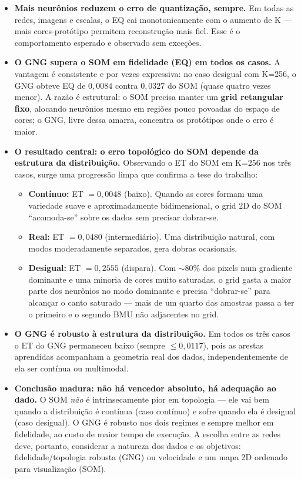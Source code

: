 \documentclass[11pt,a4paper]{article}
\begin{document}
\begin{itemize}
    \item \textbf{Mais neurônios reduzem o erro de quantização, sempre.} Em todas as redes, imagens e escalas, o EQ cai monotonicamente com o aumento de K --- mais cores-protótipo permitem reconstrução mais fiel. Esse é o comportamento esperado e observado sem exceções.

    \item \textbf{O GNG supera o SOM em fidelidade (EQ) em todos os casos.} A vantagem é consistente e por vezes expressiva: no caso desigual com K=256, o GNG obteve EQ de $0{,}0084$ contra $0{,}0327$ do SOM (quase quatro vezes menor). A razão é estrutural: o SOM precisa manter um \textbf{grid retangular fixo}, alocando neurônios mesmo em regiões pouco povoadas do espaço de cores; o GNG, livre dessa amarra, concentra os protótipos onde o erro é maior.

    \item \textbf{O resultado central: o erro topológico do SOM depende da estrutura da distribuição.} Observando o ET do SOM em K=256 nos três casos, surge uma progressão limpa que confirma a tese do trabalho:
    \begin{itemize}
        \item \textbf{Contínuo:} ET $= 0{,}0048$ (baixo). Quando as cores formam uma variedade suave e aproximadamente bidimensional, o grid 2D do SOM ``acomoda-se'' sobre os dados sem precisar dobrar-se.
        \item \textbf{Real:} ET $= 0{,}0480$ (intermediário). Uma distribuição natural, com modos moderadamente separados, gera dobras ocasionais.
        \item \textbf{Desigual:} ET $= 0{,}2555$ (dispara). Com $\sim$80\% dos pixels num gradiente dominante e uma minoria de cores muito saturadas, o grid gasta a maior parte dos neurônios no modo dominante e precisa ``dobrar-se'' para alcançar o canto saturado --- mais de um quarto das amostras passa a ter o primeiro e o segundo BMU não adjacentes no grid.
    \end{itemize}

    \item \textbf{O GNG é robusto à estrutura da distribuição.} Em todos os três casos o ET do GNG permaneceu baixo (sempre $\le 0{,}0117$), pois as arestas aprendidas acompanham a geometria real dos dados, independentemente de ela ser contínua ou multimodal.

    \item \textbf{Conclusão madura: não há vencedor absoluto, há adequação ao dado.} O SOM \textit{não} é intrinsecamente pior em topologia --- ele vai bem quando a distribuição é contínua (caso contínuo) e sofre quando ela é desigual (caso desigual). O GNG é robusto nos dois regimes e sempre melhor em fidelidade, ao custo de maior tempo de execução. A escolha entre as redes deve, portanto, considerar a natureza dos dados e os objetivos: fidelidade/topologia robusta (GNG) ou velocidade e um mapa 2D ordenado para visualização (SOM).


\end{itemize}
\end{document}
